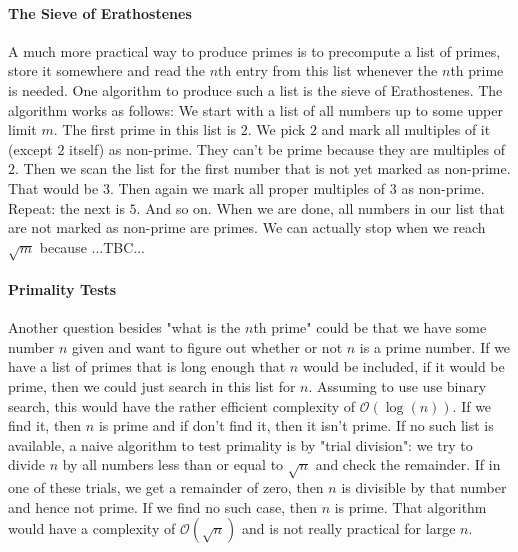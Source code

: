 
\paragraph{The Sieve of Erathostenes}
A much more practical way to produce primes is to precompute a list of primes, store it somewhere and read the $n$th entry from this list whenever the $n$th prime is needed. One algorithm to produce such a list is the sieve of Erathostenes. The algorithm works as follows: We start with a list of all numbers up to some upper limit $m$. The first prime in this list is $2$. We pick $2$ and mark all multiples of it (except $2$ itself) as non-prime. They can't be prime because they are multiples of $2$. Then we scan the list for the first number that is not yet marked as non-prime. That would be $3$. Then again we  mark all proper multiples of $3$ as non-prime. Repeat: the next is $5$. And so on. When we are done, all numbers in our list that are not marked as non-prime are primes. We can actually stop when we reach $\sqrt{m}$ because ...TBC...



\paragraph{Primality Tests}
Another question besides "what is the $n$th prime" could be that we have some number $n$ given and want to figure out whether or not $n$ is a prime number. If we have a list of primes that is long enough that $n$ would be included, if it would be prime, then we could just search in this list for $n$. Assuming to use use binary search, this would have the rather efficient complexity of $\mathcal{O}(\log(n))$. If we find it, then $n$ is prime and if don't find it, then it isn't prime. If no such list is available, a naive algorithm to test primality is by "trial division": we try to divide $n$ by all numbers less than or equal to $\sqrt{n}$ and check the remainder. If in one of these trials, we get a remainder of zero, then $n$ is divisible by that number and hence not prime. If we find no such case, then $n$ is prime. That algorithm would have a complexity of $\mathcal{O}(\sqrt{n})$ and is not really practical for large $n$.


